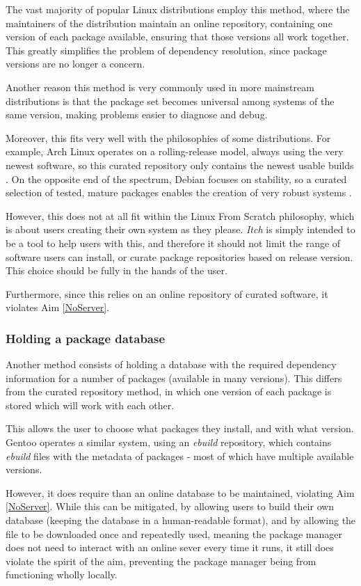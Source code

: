 \documentclass[10pt]{article}
\begin{document}
The vast majority of popular Linux distributions employ this method, where the maintainers of the distribution maintain an online repository, containing one version of each package available, ensuring that those versions all work together. This greatly simplifies the problem of dependency resolution, since package versions are no longer a concern.

Another reason this method is very commonly used in more mainstream distributions is that the package set becomes universal among systems of the same version, making problems easier to diagnose and debug.

Moreover, this fits very well with the philosophies of some distributions. For example, Arch Linux operates on a rolling-release model, always using the very newest software, so this curated repository only contains the newest usable builds \cite{ArchMain}. On the opposite end of the spectrum, Debian focuses on stability, so a curated selection of tested, mature packages enables the creation of very robust systems \cite{DebianUsability}.

However, this does not at all fit within the Linux From Scratch philosophy, which is about users creating their own system as they please. \textit{Itch} is simply intended to be a tool to help users with this, and therefore it should not limit the range of software users can install, or curate package repositories based on release version. This choice should be fully in the hands of the user.

Furthermore, since this relies on an online repository of curated software, it violates Aim \ref{NoServer}.

\subsubsection{Holding a package database}

Another method consists of holding a database with the required dependency information for a number of packages (available in many versions). This differs from the curated repository method, in which one version of each package is stored which will work with each other. 

This allows the user to choose what packages they install, and with what version. Gentoo operates a similar system, using an \textit{ebuild} repository, which contains \textit{ebuild} files with the metadata of packages \cite{GentooEbuild} - most of which have multiple available versions.

However, it does require than an online database to be maintained, violating Aim \ref{NoServer}. While this can be mitigated, by allowing users to build their own database (keeping the database in a human-readable format), and by allowing the file to be downloaded once and repeatedly used, meaning the package manager does not need to interact with an online sever every time it runs, it still does violate the spirit of the aim, preventing the package manager being from functioning wholly locally.
\end{document}
